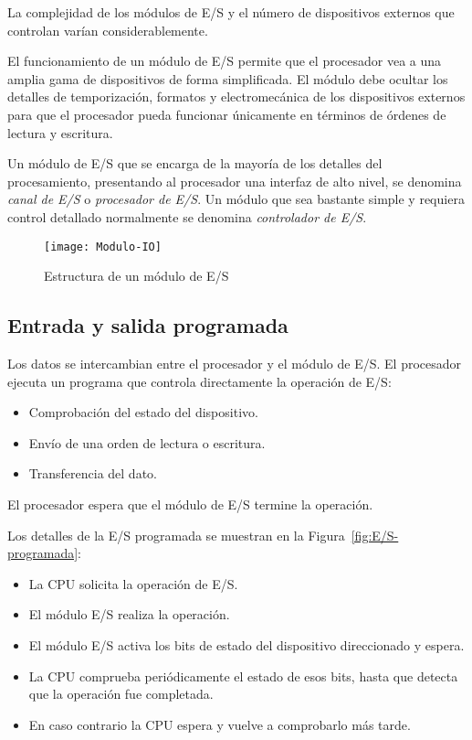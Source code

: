La complejidad de los módulos de E/S y el número de dispositivos externos que controlan varían considerablemente.

El funcionamiento de un módulo de E/S permite que el procesador vea a una amplia gama de dispositivos de forma simplificada. El módulo debe ocultar los detalles de temporización, formatos y electromecánica de los dispositivos externos para que el procesador pueda funcionar únicamente en términos de órdenes de lectura y escritura.

Un módulo de E/S que se encarga de la mayoría de los detalles del procesamiento, presentando al procesador una interfaz de alto nivel, se denomina \textit{canal de E/S} o \textit{procesador de E/S}. Un módulo que sea bastante simple y requiera control detallado normalmente se denomina \textit{controlador de E/S}.

\begin{figure}[h]
  \centering
  \texttt{[image: Modulo-IO]}
  \caption{Estructura de un módulo de E/S}\label{fig:Estructura-modulo-E/S}
\end{figure}

\subsection{Entrada y salida programada}

Los datos se intercambian entre el procesador y el módulo de E/S. El procesador ejecuta un programa que controla directamente la operación de E/S:\@
\begin{itemize}
  \item Comprobación del estado del dispositivo.
  \item Envío de una orden de lectura o escritura.
  \item Transferencia del dato.
\end{itemize}

El procesador espera que el módulo de E/S termine la operación.

Los detalles de la E/S programada se muestran en la Figura~\ref{fig:E/S-programada}:

\begin{itemize}
  \item La CPU solicita la operación de E/S.
  \item El módulo E/S realiza la operación.
  \item El módulo E/S activa los bits de estado del dispositivo direccionado y espera.
  \item La CPU comprueba periódicamente el estado de esos bits, hasta que detecta que la operación fue completada.
  \item En caso contrario la CPU espera y vuelve a comprobarlo más tarde.
\end{itemize}

